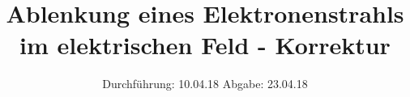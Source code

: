 

\subject{V501}
\title{Ablenkung eines Elektronenstrahls im elektrischen Feld - Korrektur}
\date{%
  Durchführung: 10.04.18
  \hspace{3em}
  Abgabe: 23.04.18
}



\maketitle
\thispagestyle{empty}
\tableofcontents
\newpage






\printbibliography{}



